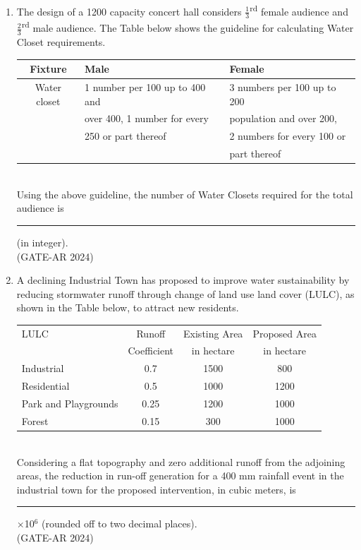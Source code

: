 \documentclass[a4paper,10pt]{article}
\begin{document}
\begin{enumerate}
    \item The design of a 1200 capacity concert hall considers $\frac{1}{3}$\textsuperscript{rd} female audience and $\frac{2}{3}$\textsuperscript{rd} male audience. The Table below shows the guideline for calculating Water Closet requirements. \\
    \begin{tabular}{ | c | l | l | }
    \hline
    Fixture & Male & Female \\
    \hline
    Water closet & 1 number per 100 up to 400 and & 3 numbers per 100 up to 200 \\
    & over 400, 1 number for every & population and over 200, \\
    & 250 or part thereof & 2 numbers for every 100 or \\
    & & part thereof \\
    \hline
    \end{tabular} \\
    Using the above guideline, the number of Water Closets required for the total audience is \rule{2cm}{0.4pt} (in integer). \\
    \hfill (GATE-AR 2024)

    \item A declining Industrial Town has proposed to improve water sustainability by reducing stormwater runoff through change of land use land cover (LULC), as shown in the Table below, to attract new residents. \\
    \begin{tabular}{ | l | c | c | c | }
    \hline
    LULC & Runoff & Existing Area & Proposed Area \\
    & Coefficient & in hectare & in hectare \\
    \hline
    Industrial & 0.7 & 1500 & 800 \\
    \hline
    Residential & 0.5 & 1000 & 1200 \\
    \hline
    Park and Playgrounds & 0.25 & 1200 & 1000 \\
    \hline
    Forest & 0.15 & 300 & 1000 \\
    \hline
    \end{tabular} \\
    Considering a flat topography and zero additional runoff from the adjoining areas, the reduction in run-off generation for a 400 mm rainfall event in the industrial town for the proposed intervention, in cubic meters, is \rule{2cm}{0.4pt}$\times$10$^6$ (rounded off to two decimal places). \\
    \hfill (GATE-AR 2024)


\end{enumerate}
\end{document}
